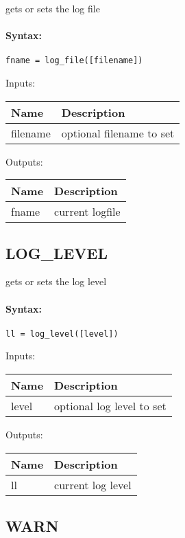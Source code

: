 gets or sets the log file

\paragraph{Syntax:} \verb|fname = log_file([filename])|

\bigskip
Inputs:

\begin{tabular}{|p{}|p{}|}
\hline
\textbf{Name} & \textbf{Description} \\
\hline \hline
filename & optional filename to set  \\ \hline
\end{tabular}

\bigskip
Outputs:

\begin{tabular}{|p{}|p{}|}
\hline
\textbf{Name} & \textbf{Description} \\
\hline \hline
fname & current logfile  \\ \hline
\end{tabular}

\subsection{LOG\_LEVEL}

gets or sets the log level

\paragraph{Syntax:} \verb|ll = log_level([level])|

\bigskip
Inputs:

\begin{tabular}{|p{}|p{}|}
\hline
\textbf{Name} & \textbf{Description} \\
\hline \hline
level & optional log level to set  \\ \hline
\end{tabular}

\bigskip
Outputs:

\begin{tabular}{|p{}|p{}|}
\hline
\textbf{Name} & \textbf{Description} \\
\hline \hline
ll & current log level  \\ \hline
\end{tabular}

\subsection{WARN}

